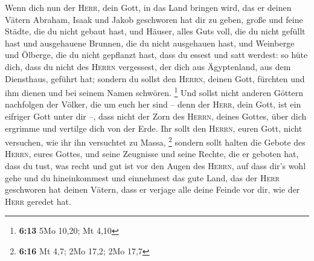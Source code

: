  Wenn dich nun der \textsc{Herr}, dein Gott, in das Land
bringen wird, das er deinen Vätern Abraham, Isaak und Jakob geschworen
hat dir zu geben, große und feine Städte, die du nicht gebaut hast,
 und Häuser, alles Guts voll, die du nicht gefüllt hast
und ausgehauene Brunnen, die du nicht ausgehauen hast, und Weinberge und
Ölberge, die du nicht gepflanzt hast, dass du essest und satt werdest:
 so hüte dich, dass du nicht des \textsc{Herrn}
vergessest, der dich aus Ägyptenland, aus dem Diensthaus, geführt hat;
 sondern du sollst den \textsc{Herrn}, deinen Gott,
fürchten und ihm dienen und bei seinem Namen schwören. \footnote{\textbf{6:13}
  5Mo 10,20; Mt 4,10}  Und sollst nicht anderen Göttern
nachfolgen der Völker, die um euch her sind --  denn der
\textsc{Herr}, dein Gott, ist ein eifriger Gott unter dir --, dass nicht
der Zorn des \textsc{Herrn}, deines Gottes, über dich ergrimme und
vertilge dich von der Erde.  Ihr sollt den
\textsc{Herrn}, euren Gott, nicht versuchen, wie ihr ihn versuchtet zu
Massa, \footnote{\textbf{6:16} Mt 4,7; 2Mo 17,2; 2Mo 17,7}
 sondern sollt halten die Gebote des \textsc{Herrn},
eures Gottes, und seine Zeugnisse und seine Rechte, die er geboten hat,
 dass du tust, was recht und gut ist vor den Augen des
\textsc{Herrn}, auf dass dir's wohl gehe und du hineinkommest und
einnehmest das gute Land, das der \textsc{Herr} geschworen hat deinen
Vätern,  dass er verjage alle deine Feinde vor dir, wie
der \textsc{Herr} geredet hat.

